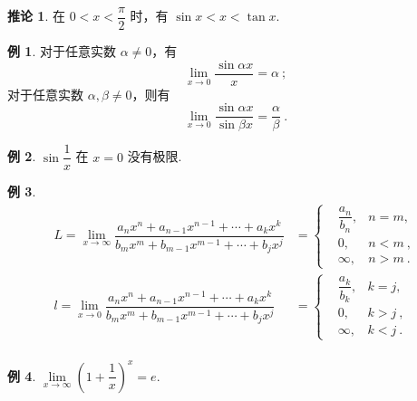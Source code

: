 \documentclass[zihao=-4,linespread=1.8,UTF8,nothm]{aytony_base}
\theoremstyle{definition}
\newtheorem*{corollary}{\indent\heiti\textbf{推论}}
\newtheorem{example}{\indent\heiti\textbf{例}}[subsection]
\begin{document}
\begin{corollary}
    在 $0 < x < \dfrac{\pi}{2}$ 时，有 $\sin x < x < \tan x$.
\end{corollary}

\begin{example}
    对于任意实数 $\alpha \neq 0$，有 $$
        \lim\limits_{x \to 0} \dfrac{\sin \alpha x}{x} = \alpha\ ;
    $$ 对于任意实数 $\alpha, \beta \neq 0$，则有 $$
        \lim\limits_{x \to 0} \dfrac{\sin \alpha x}{\sin \beta x} = \dfrac{\alpha}{\beta}\ .
    $$
\end{example}

\begin{example}
    $\sin \dfrac{1}{x}$ 在 $x = 0$ 没有极限.
\end{example}

\setcounter{example}{11}
\begin{example}
    $$
        \begin{aligned}
            L = \lim\limits_{x \to \infty} \dfrac{a_nx^n + a_{n-1}x^{n-1} + \cdots + a_kx^k}{b_mx^m + b_{m-1}x^{m-1} + \cdots + b_jx^j} & = \left\{
            \begin{aligned}
                 & \dfrac{a_n}{b_n}, & n = m ,  \\
                 & 0,                & n < m\ , \\
                 & \infty,           & n > m\ .
            \end{aligned}
            \right.                                                                                                                                 \\
            l = \lim\limits_{x \to 0} \dfrac{a_nx^n + a_{n-1}x^{n-1} + \cdots + a_kx^k}{b_mx^m + b_{m-1}x^{m-1} + \cdots + b_jx^j}      & = \left\{
            \begin{aligned}
                 & \dfrac{a_k}{b_k}, & k= j ,  \\
                 & 0,                & k> j\ , \\
                 & \infty,           & k< j\ .
            \end{aligned}
            \right.                                                                                                                                 \\
        \end{aligned}
    $$
\end{example}

\begin{example}
    $\lim\limits_{x \to \infty} \left(1+\dfrac{1}{x}\right)^x = e$.
\end{example}
\end{document}
